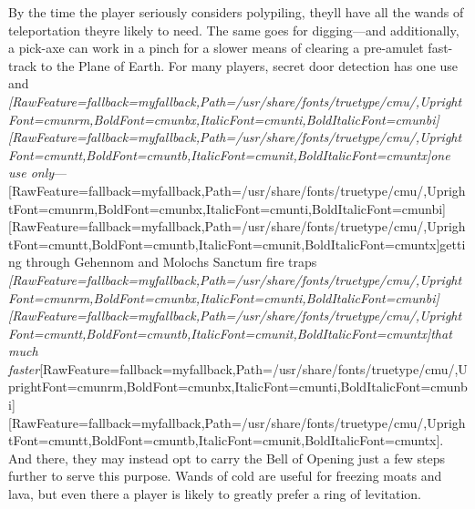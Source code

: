 By the time the player seriously considers polypiling, they\textquotesingle{}ll have all the wands of teleportation they\textquotesingle{}re likely to need. The same goes for digging{\mbox{$\text{---}$}}and additionally, a pick-{}axe\footnotemark[181] can work in a pinch for a slower means of clearing a pre-{}amulet fast-{}track to the Plane of Earth\footnotemark[182]. For many players, secret door detection has one use and {\itshape \allowbreak{}\setmainfont{cmunti.ttf}[RawFeature={fallback=myfallback},Path=/usr/share/fonts/truetype/cmu/,UprightFont=cmunrm,BoldFont=cmunbx,ItalicFont=cmunti,BoldItalicFont=cmunbi]\setmonofont{cmunti.ttf}[RawFeature={fallback=myfallback},Path=/usr/share/fonts/truetype/cmu/,UprightFont=cmuntt,BoldFont=cmuntb,ItalicFont=cmunit,BoldItalicFont=cmuntx]\itshape one use only}{\mbox{$\text{---}$}}\allowbreak{}\setmainfont{cmunrm.ttf}[RawFeature={fallback=myfallback},Path=/usr/share/fonts/truetype/cmu/,UprightFont=cmunrm,BoldFont=cmunbx,ItalicFont=cmunti,BoldItalicFont=cmunbi]\setmonofont{cmunrm.ttf}[RawFeature={fallback=myfallback},Path=/usr/share/fonts/truetype/cmu/,UprightFont=cmuntt,BoldFont=cmuntb,ItalicFont=cmunit,BoldItalicFont=cmuntx]getting through Gehennom\footnotemark[183] and Moloch\textquotesingle{}s Sanctum\footnotemark[184] fire traps {\itshape \allowbreak{}\setmainfont{cmunti.ttf}[RawFeature={fallback=myfallback},Path=/usr/share/fonts/truetype/cmu/,UprightFont=cmunrm,BoldFont=cmunbx,ItalicFont=cmunti,BoldItalicFont=cmunbi]\setmonofont{cmunti.ttf}[RawFeature={fallback=myfallback},Path=/usr/share/fonts/truetype/cmu/,UprightFont=cmuntt,BoldFont=cmuntb,ItalicFont=cmunit,BoldItalicFont=cmuntx]\itshape that much faster}\allowbreak{}\setmainfont{cmunrm.ttf}[RawFeature={fallback=myfallback},Path=/usr/share/fonts/truetype/cmu/,UprightFont=cmunrm,BoldFont=cmunbx,ItalicFont=cmunti,BoldItalicFont=cmunbi]\setmonofont{cmunrm.ttf}[RawFeature={fallback=myfallback},Path=/usr/share/fonts/truetype/cmu/,UprightFont=cmuntt,BoldFont=cmuntb,ItalicFont=cmunit,BoldItalicFont=cmuntx]. And there, they may instead opt to carry the Bell of Opening\footnotemark[185] just a few steps further to serve this purpose. Wands of cold are useful for freezing moats and lava, but even there a player is likely to greatly prefer a ring of levitation\footnotemark[186].



